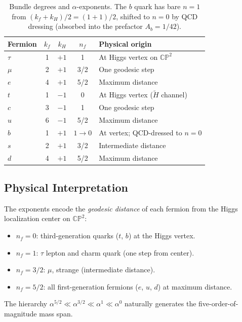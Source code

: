 \documentclass[11pt,a4paper]{article}
\newcommand{\CP}{\mathbb{CP}}
\theoremstyle{remark}
\begin{document}
\begin{table}[h]
\centering
\renewcommand{\arraystretch}{1.15}
\begin{tabular}{lcccl}
\toprule
Fermion & $k_f$ & $k_H$ & $n_f$ & Physical origin \\
\midrule
$\tau$  & 1 & $+1$ & 1   & At Higgs vertex on $\CP^2$ \\
$\mu$   & 2 & $+1$ & 3/2 & One geodesic step \\
$e$     & 4 & $+1$ & 5/2 & Maximum distance \\
$t$     & 1 & $-1$ & 0   & At Higgs vertex ($\widetilde{H}$ channel) \\
$c$     & 3 & $-1$ & 1   & One geodesic step \\
$u$     & 6 & $-1$ & 5/2 & Maximum distance \\
$b$     & 1 & $+1$ & $1 \to 0$  & At vertex; QCD-dressed to $n = 0$ \\
$s$     & 2 & $+1$ & 3/2 & Intermediate distance \\
$d$     & 4 & $+1$ & 5/2 & Maximum distance \\
\bottomrule
\end{tabular}
\caption{Bundle degrees and $\alpha$-exponents.  The $b$ quark has
bare $n = 1$ from $(k_f + k_H)/2 = (1+1)/2$, shifted to $n = 0$ by
QCD dressing (absorbed into the prefactor $A_b = 1/42$).}
\label{tab:bundles}
\end{table}

\subsection{Physical Interpretation}

The exponents encode the \emph{geodesic distance} of each fermion from the
Higgs localization center on $\CP^2$:
\begin{itemize}
\item $n_f = 0$: third-generation quarks ($t$, $b$) at the Higgs vertex.
\item $n_f = 1$: $\tau$ lepton and charm quark (one step from center).
\item $n_f = 3/2$: $\mu$, strange (intermediate distance).
\item $n_f = 5/2$: all first-generation fermions ($e$, $u$, $d$) at maximum distance.
\end{itemize}

The hierarchy $\alpha^{5/2} \ll \alpha^{3/2} \ll \alpha^1 \ll \alpha^0$
naturally generates the five-order-of-magnitude mass span.
\end{document}
